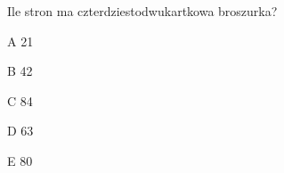 \begin{tresc}
Ile stron ma czterdziestodwukartkowa broszurka?
\end{tresc}
\begin{wariant}{A} 21 \end{wariant}
\begin{wariant}{B} 42 \end{wariant}
\begin{wariant}{C} 84 \end{wariant}
\begin{wariant}{D} 63 \end{wariant}
\begin{wariant}{E} 80 \end{wariant}
